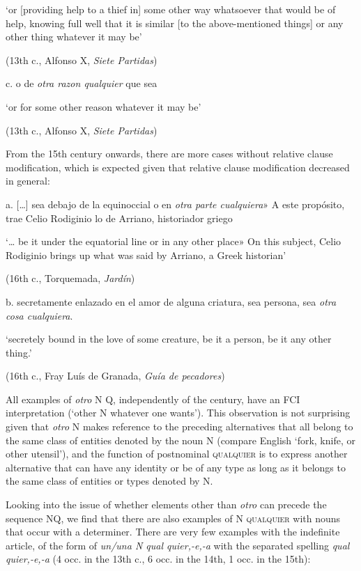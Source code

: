 \documentclass[output=paper]{langscibook}
\begin{document}
    ‘or [providing help to a thief in] some other way whatsoever that would be of help, knowing full well that it is similar [to the above-mentioned things] or any other thing whatever it may be’

    (13th c., Alfonso X, \textit{Siete Partidas})

  c.  o de \textit{otra razon qualquier} que sea 

    ‘or for some other reason whatever it may be’

    (13th c., Alfonso X, \textit{Siete Partidas})

From the 15th century onwards, there are more cases without relative clause modification, which is expected given that relative clause modification decreased in general:

  a.  […] sea debajo de la equinoccial o en \textit{otra parte cualquiera}» A este propósito, trae Celio Rodiginio lo de Arriano, historiador griego 

    ‘… be it under the equatorial line or in any other place» On this subject, Celio Rodiginio brings up what was said by Arriano, a Greek historian’

    (16th c., Torquemada, \textit{Jardín})

  b.  secretamente enlazado en el amor de alguna criatura, sea persona, sea \textit{otra cosa cualquiera}. 

    ‘secretely bound in the love of some creature, be it a person, be it any other thing.’

    (16th c., Fray Luís de Granada, \textit{Guía de pecadores})

All examples of \textit{otro} N Q, independently of the century, have an FCI interpretation (‘other N whatever one wants’). This observation is not surprising given that \textit{otro} N makes reference to the preceding alternatives that all belong to the same class of entities denoted by the noun N (compare English ‘fork, knife, or other utensil’), and the function of postnominal \textsc{qualquier} is to express another alternative that can have any identity or be of any type as long as it belongs to the same class of entities or types denoted by N.

  Looking into the issue of whether elements other than \textit{otro} can precede the sequence NQ, we find that there are also examples of N \textsc{qualquier} with nouns that occur with a determiner. There are very few examples with the indefinite article, of the form of \textit{un/una N qual quier,-e,-a} with the separated spelling \textit{qual quier,-e,-a} (4 occ. in the 13th c., 6 occ. in the 14th, 1 occ. in the 15th):
\end{document}
